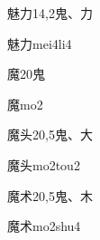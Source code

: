 \begin{entry}{魅力}{14,2}{⿁、⼒}
  \begin{phonetics}{魅力}{mei4li4}
  \end{phonetics}
\end{entry}

\begin{entry}{魔}{20}{⿁}
  \begin{phonetics}{魔}{mo2}
  \end{phonetics}
\end{entry}

\begin{entry}{魔头}{20,5}{⿁、⼤}
  \begin{phonetics}{魔头}{mo2tou2}
  \end{phonetics}
\end{entry}

\begin{entry}{魔术}{20,5}{⿁、⽊}
  \begin{phonetics}{魔术}{mo2shu4}
  \end{phonetics}
\end{entry}


